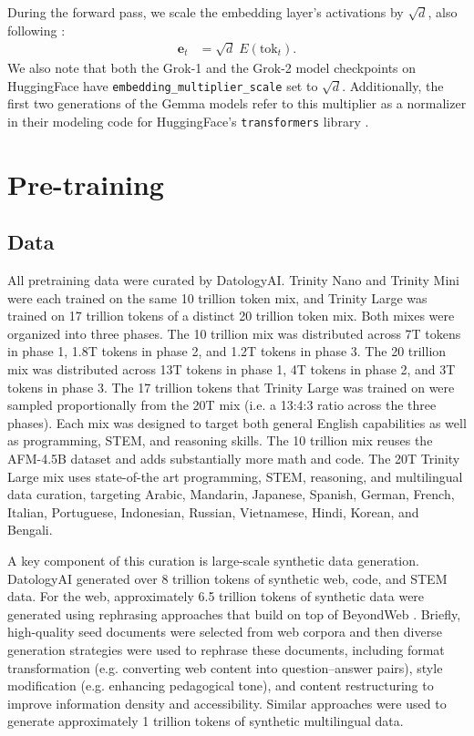 \documentclass{article}
\begin{document}
During the forward pass, we scale the embedding layer's activations by $\sqrt{d}$, also following \cite{takase2025spikemorestabilizingpretraining}:
\begin{align}
\mathbf{e}_t &= \sqrt{d}\;E(\mathrm{tok}_t).
\tag{39}
\end{align}
We also note that both the Grok-1 and the Grok-2 model checkpoints on HuggingFace \citep{xai_grok1_hf, xai_grok2_hf} have \texttt{embedding\_multiplier\_scale} set to $\sqrt{d}$. Additionally, the first two generations of the Gemma models \citep{gemmateam2024gemmaopenmodelsbased, gemmateam2024gemma2improvingopen} refer to this multiplier as a normalizer in their modeling code for HuggingFace's \texttt{transformers} library \citep{huggingface_transformers_github}.


\section{Pre-training}

\subsection{Data}

All pretraining data were curated by DatologyAI. Trinity Nano and Trinity Mini were each trained on the same 10 trillion token mix, and Trinity Large was trained on 17 trillion tokens of a distinct 20 trillion token mix. Both mixes were organized into three phases. The 10 trillion mix was distributed across 7T tokens in phase 1, 1.8T tokens in phase 2, and 1.2T tokens in phase 3. The 20 trillion mix was distributed across 13T tokens in phase 1, 4T tokens in phase 2, and 3T tokens in phase 3. The 17 trillion tokens that Trinity Large was trained on were sampled proportionally from the 20T mix (i.e. a 13:4:3 ratio across the three phases). Each mix was designed to target both general English capabilities as well as programming, STEM, and reasoning skills. The 10 trillion mix reuses the AFM-4.5B dataset and adds substantially more math and code. The 20T Trinity Large mix uses state-of-the art programming, STEM, reasoning, and multilingual data curation, targeting Arabic, Mandarin, Japanese, Spanish, German, French, Italian, Portuguese, Indonesian, Russian, Vietnamese, Hindi, Korean, and Bengali.

A key component of this curation is large-scale synthetic data generation. DatologyAI generated over 8 trillion tokens of synthetic web, code, and STEM data. For the web, approximately 6.5 trillion tokens of synthetic data were generated using rephrasing approaches that build on top of BeyondWeb \citep{maini2025beyondweb}. Briefly, high-quality seed documents were selected from web corpora and then diverse generation strategies were used to rephrase these documents, including format transformation (e.g. converting web content into question–answer pairs), style modification (e.g. enhancing pedagogical tone), and content restructuring to improve information density and accessibility. Similar approaches were used to generate approximately 1 trillion tokens of synthetic multilingual data.
\end{document}
